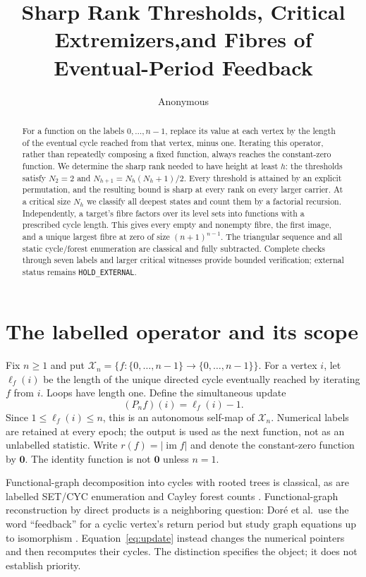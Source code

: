 \documentclass[a4paper,10pt]{amsart}
\title[Eventual-period feedback]{Sharp Rank Thresholds, Critical Extremizers,\newline and Fibres of Eventual-Period Feedback}
\author{Anonymous}
\date{}
\theoremstyle{remark}
\newcommand{\im}{\operatorname{im}}
\newcommand{\calX}{\mathcal X}
\newcommand{\zero}{\boldsymbol 0}
\begin{document}
\begin{abstract}
For a function on the labels $0,\ldots,n-1$, replace its value at each
vertex by the length of the eventual cycle reached from that vertex,
minus one. Iterating this operator, rather than repeatedly composing a
fixed function, always reaches the constant-zero function. We determine
the sharp rank needed to have height at least $h$: the thresholds satisfy
$N_2=2$ and $N_{h+1}=N_h(N_h+1)/2$. Every threshold is attained by an
explicit permutation, and the resulting bound is sharp at every rank on
every larger carrier. At a critical size $N_h$ we classify all deepest
states and count them by a factorial recursion. Independently, a target's
fibre factors over its level sets into functions with a prescribed cycle
length. This gives every empty and nonempty fibre, the first image, and
a unique largest fibre at zero of size $(n+1)^{n-1}$. The triangular
sequence and all static cycle/forest enumeration are classical and fully
subtracted. Complete checks through seven labels and larger critical
witnesses provide bounded verification; external status remains
\texttt{HOLD\_EXTERNAL}.
\end{abstract}
\maketitle

\section{The labelled operator and its scope}
Fix $n\ge1$ and put
$\calX_n=\{f:\{0,\ldots,n-1\}\to\{0,\ldots,n-1\}\}$.
For a vertex $i$, let $\ell_f(i)$ be the length of the unique directed
cycle eventually reached by iterating $f$ from $i$. Loops have length
one. Define the simultaneous update
\begin{equation}\label{eq:update}
 (P_nf)(i)=\ell_f(i)-1.
\end{equation}
Since $1\le\ell_f(i)\le n$, this is an autonomous self-map of
$\calX_n$. Numerical labels are retained at every epoch; the output is
used as the next function, not as an unlabelled statistic. Write
$r(f)=|\im f|$ and denote the constant-zero function by $\zero$.
The identity function is not $\zero$ unless $n=1$.

Functional-graph decomposition into cycles with rooted trees is classical,
as are labelled SET/CYC enumeration and Cayley forest counts
\cite{FlajoletSedgewick2009}. Functional-graph reconstruction by direct
products is a neighboring question: Dor\'e et al.\ use the word
``feedback'' for a cyclic vertex's return period but study graph equations
up to isomorphism \cite{DoreEtAl2022v2}. Equation~\eqref{eq:update}
instead changes the numerical pointers and then recomputes their cycles.
The distinction specifies the object; it does not establish priority.
\end{document}
